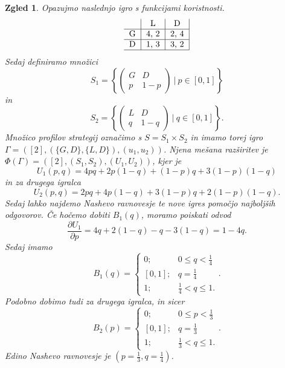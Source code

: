 \documentclass[10pt, a4paper]{article}
\newtheorem{zgled}[izr]{Zgled}
\begin{document}
\begin{zgled}
  Opazujmo naslednjo igro s funkcijami koristnosti.
  $$
  \begin{tabular}{c|c|c|}
    & \textrm{L} & \textrm{D}\\
    \hline
    \textrm{G} & 4, 2 & 2, 4\\
    \hline
    \textrm{D} & 1, 3 & 3, 2\\
    \hline
  \end{tabular}
  $$
  Sedaj definiramo množici 
  $$S_1 = \left\lbrace \begin{pmatrix}
    G & D\\
    p & 1 - p
  \end{pmatrix}\ \big|\ p \in [0, 1]\right\rbrace$$
  in 
  $$S_2 = \left\lbrace \begin{pmatrix}
    L & D\\
    q & 1 - q
  \end{pmatrix}\ \big|\ q \in [0, 1]\right\rbrace.$$
  Množico profilov strategij označimo s $S = S_1 \times S_2$ in imamo torej igro 
  $\Gamma = ([2], \left(\{G, D\}, \{L, D\} \right), (u_1, u_2))$.
  Njena mešana razširitev je $\Phi (\Gamma) = \left([2], (S_1, S_2), (U_1, U_2)\right)$,
  kjer je 
  $$U_1 (p, q) = 4pq + 2 p(1 - q) + (1 - p)q + 3 (1 - p) (1 - q)$$ 
  in za drugega igralca 
  $$U_2 (p, q) = 2pq + 4 p(1 - q) + 3 (1 - p) q + 2 (1 - p) (1 - q).$$
  Sedaj lahko najdemo Nashevo ravnovesje te nove igres pomočjo najboljših odgovorov.
  Če hočemo dobiti $B_1 (q)$, moramo poiskati odvod 
  $$\frac{\partial U_1}{\partial p} = 4q + 2 (1 - q) - q - 3(1 - q) = 1 - 4q.$$
  Sedaj imamo 
  $$B_1 (q) = \begin{cases}
    0; & 0 \leq q < \frac{1}{4}\\
    [0, 1]; & q = \frac{1}{4}\\
    1;& \frac{1}{4} < q \leq 1.
  \end{cases}.$$
  Podobno dobimo tudi za drugega igralca, in sicer 
  $$B_2 (p) = \begin{cases}
    0; & 0 \leq p < \frac{1}{3}\\
    [0, 1]; & q = \frac{1}{3}\\
    1;& \frac{1}{3} < q \leq 1.
  \end{cases}.$$
  Edino Nashevo ravnovesje je $\left(p = \frac{1}{3}, q = \frac{1}{4}\right)$.
\end{zgled}
\end{document}
